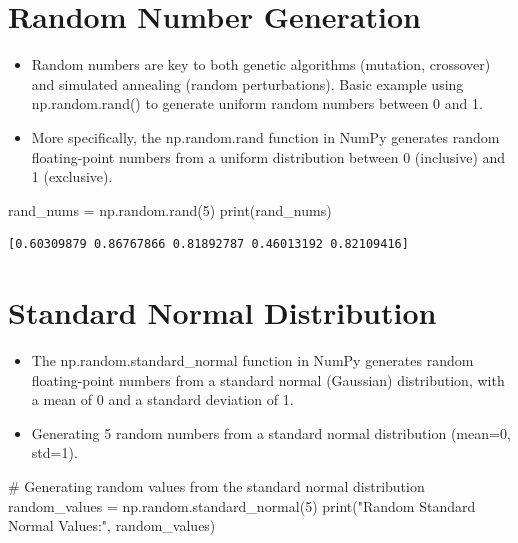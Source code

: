 \documentclass[
  letterpaper,
  DIV=11,
  numbers=noendperiod]{scrreprt}
\newenvironment{Shaded}{\begin{snugshade}}{\end{snugshade}}
\newcommand{\BuiltInTok}[1]{\textcolor[rgb]{0.00,0.23,0.31}{#1}}
\newcommand{\CommentTok}[1]{\textcolor[rgb]{0.37,0.37,0.37}{#1}}
\newcommand{\DecValTok}[1]{\textcolor[rgb]{0.68,0.00,0.00}{#1}}
\newcommand{\NormalTok}[1]{\textcolor[rgb]{0.00,0.23,0.31}{#1}}
\newcommand{\OperatorTok}[1]{\textcolor[rgb]{0.37,0.37,0.37}{#1}}
\newcommand{\StringTok}[1]{\textcolor[rgb]{0.13,0.47,0.30}{#1}}
\providecommand{\tightlist}{%
  \setlength{\itemsep}{0pt}\setlength{\parskip}{0pt}}\usepackage{longtable,booktabs,array}
\begin{document}
\section{Random Number Generation}\label{random-number-generation}

\begin{itemize}
\tightlist
\item
  Random numbers are key to both genetic algorithms (mutation,
  crossover) and simulated annealing (random perturbations). Basic
  example using np.random.rand() to generate uniform random numbers
  between 0 and 1.
\item
  More specifically, the np.random.rand function in NumPy generates
  random floating-point numbers from a uniform distribution between 0
  (inclusive) and 1 (exclusive).
\end{itemize}

\begin{Shaded}
\begin{Highlighting}[]
\NormalTok{rand\_nums }\OperatorTok{=}\NormalTok{ np.random.rand(}\DecValTok{5}\NormalTok{)}
\BuiltInTok{print}\NormalTok{(rand\_nums)}
\end{Highlighting}
\end{Shaded}

\begin{verbatim}
[0.60309879 0.86767866 0.81892787 0.46013192 0.82109416]
\end{verbatim}

\section{Standard Normal
Distribution}\label{standard-normal-distribution}

\begin{itemize}
\tightlist
\item
  The np.random.standard\_normal function in NumPy generates random
  floating-point numbers from a standard normal (Gaussian) distribution,
  with a mean of 0 and a standard deviation of 1.
\item
  Generating 5 random numbers from a standard normal distribution
  (mean=0, std=1).
\end{itemize}

\begin{Shaded}
\begin{Highlighting}[]
\CommentTok{\# Generating random values from the standard normal distribution}
\NormalTok{random\_values }\OperatorTok{=}\NormalTok{ np.random.standard\_normal(}\DecValTok{5}\NormalTok{)}
\BuiltInTok{print}\NormalTok{(}\StringTok{"Random Standard Normal Values:"}\NormalTok{, random\_values)}
\end{Highlighting}
\end{Shaded}
\end{document}

